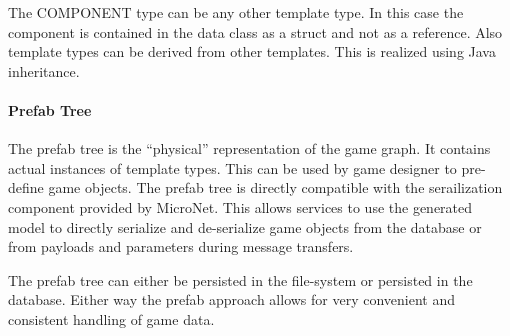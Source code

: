 The COMPONENT type can be any other template type. In this case the component is
contained in the data class as a struct and not as a reference. Also template
types can be derived from other templates. This is realized using Java
inheritance.

\paragraph{Prefab Tree}

The prefab tree is the ``physical'' representation of the game graph. It
contains actual instances of template types. This can be used by game designer
to pre-define game objects. The prefab tree is directly compatible with the
serailization component provided by MicroNet. This allows services to use the
generated model to directly serialize and de-serialize game objects from the
database or from payloads and parameters during message transfers.

The prefab tree can either be persisted in the file-system or persisted in the
database. Either way the prefab approach allows for very convenient and
consistent handling of game data.

